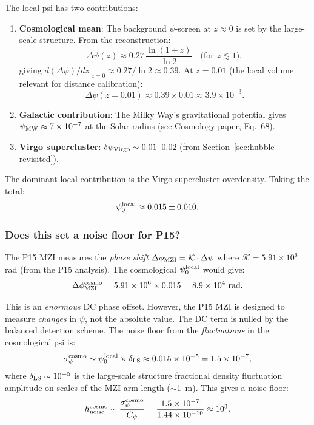 \documentclass[11pt]{article}
\theoremstyle{definition}
\theoremstyle{remark}
\newcommand{\ee}[1]{\times 10^{#1}}
\begin{document}
The local psi has two contributions:
\begin{enumerate}
\item \textbf{Cosmological mean}: The background $\psi$-screen at $z \approx 0$
is set by the large-scale structure. From the reconstruction:
\begin{equation}
\Delta\psi(z) \approx 0.27\,\frac{\ln(1+z)}{\ln 2}
\quad\text{(for } z \lesssim 1),
\end{equation}
giving $d(\Delta\psi)/dz|_{z=0} \approx 0.27/\ln 2 \approx 0.39$.
At $z = 0.01$ (the local volume relevant for distance calibration):
\begin{equation}
\Delta\psi(z=0.01) \approx 0.39 \times 0.01 \approx 3.9\ee{-3}.
\end{equation}

\item \textbf{Galactic contribution}: The Milky Way's gravitational potential
gives $\psi_{\rm MW} \approx 7\ee{-7}$ at the Solar radius (see Cosmology
paper, Eq.~68).

\item \textbf{Virgo supercluster}: $\delta\psi_{\rm Virgo} \sim 0.01$--$0.02$
(from Section~\ref{sec:hubble-revisited}).
\end{enumerate}

The dominant local contribution is the Virgo supercluster overdensity.
Taking the total:
\begin{equation}
\psi_0^{\rm local} \approx 0.015 \pm 0.010.
\end{equation}

\subsubsection{Does this set a noise floor for P15?}

The P15 MZI measures the \emph{phase shift} $\Delta\phi_{\rm MZI} =
\mathcal{K}\cdot\Delta\psi$ where $\mathcal{K} = 5.91\ee{6}$ rad (from the
P15 analysis). The cosmological $\psi_0^{\rm local}$ would give:
\begin{equation}
\Delta\phi_{\rm MZI}^{\rm cosmo} = 5.91\ee{6} \times 0.015 = 8.9\ee{4}~\text{rad}.
\end{equation}

This is an \emph{enormous} DC phase offset. However, the P15 MZI is designed
to measure \emph{changes} in $\psi$, not the absolute value. The DC term is
nulled by the balanced detection scheme. The noise floor from the \emph{fluctuations}
in the cosmological psi is:
\begin{equation}
\sigma_{\psi}^{\rm cosmo} \sim \psi_0^{\rm local}\times\delta_{\rm LS}
\approx 0.015 \times 10^{-5} = 1.5\ee{-7},
\end{equation}
where $\delta_{\rm LS} \sim 10^{-5}$ is the large-scale structure fractional
density fluctuation amplitude on scales of the MZI arm length ($\sim$1~m).
This gives a noise floor:
\begin{equation}
h_{\rm noise}^{\rm cosmo} \sim \frac{\sigma_\psi^{\rm cosmo}}{C_\psi}
= \frac{1.5\ee{-7}}{1.44\ee{-10}} \approx 10^3.
\end{equation}
\end{document}
